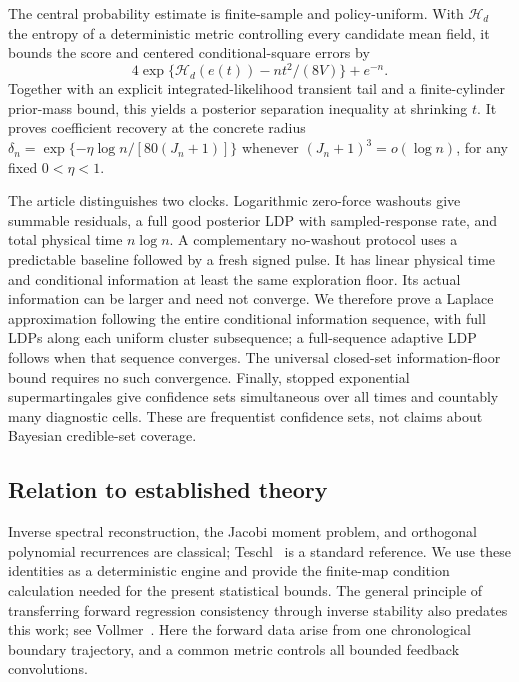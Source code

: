 The central probability estimate is finite-sample and policy-uniform. With
\(\mathcal H_d\) the entropy of a deterministic metric controlling every
candidate mean field, it bounds the score and centered conditional-square
errors by
\[
 4\exp\{\mathcal H_d(e(t))-nt^2/(8V)\}+e^{-n}.
\]
Together with an explicit integrated-likelihood transient tail and a
finite-cylinder prior-mass bound, this yields a posterior separation
inequality at shrinking \(t\). It proves coefficient recovery at the
concrete radius
\(\delta_n=\exp\{-\eta\log n/[80(J_n+1)]\}\) whenever
\((J_n+1)^3=o(\log n)\), for any fixed \(0<\eta<1\).

The article distinguishes two clocks. Logarithmic zero-force washouts give
summable residuals, a full good posterior LDP with sampled-response rate,
and total physical time \(n\log n\). A complementary no-washout protocol
uses a predictable baseline followed by a fresh signed pulse. It has linear
physical time and conditional information at least the same exploration
floor. Its actual information can be larger and need not converge. We
therefore prove a Laplace approximation following the entire conditional
information sequence, with full LDPs along each uniform cluster subsequence;
a full-sequence adaptive LDP follows when that sequence converges. The
universal closed-set information-floor bound requires no such convergence.
Finally, stopped exponential supermartingales give confidence sets
simultaneous over all times and countably many diagnostic cells. These are
frequentist confidence sets, not claims about Bayesian credible-set coverage.

\subsection{Relation to established theory}
Inverse spectral reconstruction, the Jacobi moment problem, and orthogonal
polynomial recurrences are classical; Teschl~\cite{Teschl2000} is a standard
reference. We use these identities as a deterministic engine and provide the
finite-map condition calculation needed for the present statistical bounds.
The general principle of transferring forward regression consistency through
inverse stability also predates this work; see Vollmer~\cite{Vollmer2013}.
Here the forward data arise from one chronological boundary trajectory, and
a common metric controls all bounded feedback convolutions.

